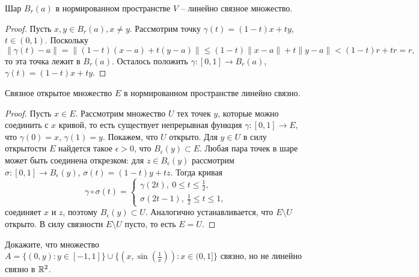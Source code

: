 \begin{example}
    Шар $B_{r}(a)$ в нормированном пространстве $V$ -- линейно связное множество.
\end{example}

\begin{proof}
    Пусть $x, y \in B_{r}(a), x \neq y$. Рассмотрим точку $\gamma(t) = (1 - t)x + ty$, $t \in (0, 1)$. Поскольку
    \[\|\gamma(t) - a\| = \|(1 - t)(x - a) + t(y - a)\| \leq (1 - t)\|x - a\| + t\|y - a\| < (1 - t)r + tr = r,\]
    то эта точка лежит в $B_{r}(a)$. Осталось положить $\gamma: [0, 1] \to B_{r}(a)$, $\gamma(t) = (1 - t)x + ty$.
\end{proof}

\begin{lemma}
    Связное открытое множество $E$ в нормированном пространстве линейно связно.
\end{lemma}

\begin{proof}
    Пусть $x \in E$. Рассмотрим множество $U$ тех точек $y$, которые можно соединить с $x$ кривой, то есть существует непрерывная функция $\gamma: [0, 1] \to E$, что $\gamma(0) = x$, $\gamma(1) = y$. Покажем, что $U$ открыто. Для $y \in U$ в силу открытости $E$ найдется такое $\epsilon > 0$, что $B_{\epsilon}(y) \subset E$. Любая пара точек в шаре может быть соединена открезком: для $z \in B_{\epsilon}(y)$ рассмотрим $\sigma: [0, 1] \to B_{\epsilon}(y)$, $\sigma(t) = (1 - t)y + tz$. Тогда кривая
    \[\gamma \circ \sigma(t) = \begin{cases}
        \gamma(2t), \ 0 \leq t \leq \frac{1}{2}, \\
        \sigma(2t - 1), \ \frac{1}{2} \leq t \leq 1,
    \end{cases}\]
    соединяет $x$ и $z$, поэтому $B_{\epsilon}(y) \subset U$. Аналогично устанавливается, что $E \setminus U$ открыто. В силу связности $E \setminus U$ пусто, то есть $E = U$.
\end{proof}

\begin{problem}
    Докажите, что множество $A = \{(0, y): y \in [-1, 1]\} \cup \{(x, \sin(\frac{1}{x})): x \in (0, 1]\}$ связно, но не линейно связно в $\mathbb{R}^{2}$.
\end{problem}